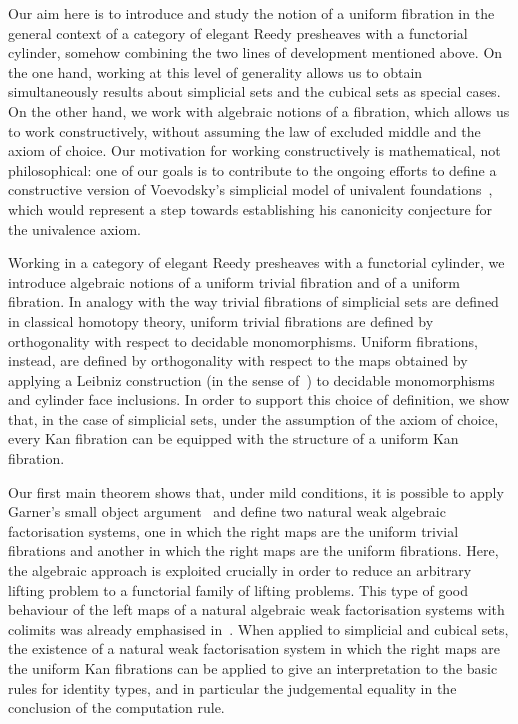 \documentclass[reqno,10pt,a4paper,oneside]{amsart}
\begin{document}
Our aim here is to introduce and study the notion of a uniform fibration in the general context of
a category of elegant Reedy presheaves with a functorial cylinder, somehow combining the two lines of development mentioned above. 
On the one hand, working  at this level of generality allows us  
to obtain simultaneously results about simplicial sets and the cubical sets as special cases. On the other hand, we work with algebraic notions of a fibration,
which allows us to work constructively, \ie without assuming the law of excluded middle and the axiom of choice. Our motivation for working constructively is mathematical, not philosophical: one of our goals is to contribute to the ongoing efforts to define a constructive version of Voevodsky's simplicial model of univalent foundations~\cite{voevodsky-simplicial-model}, which would represent a step towards establishing his canonicity conjecture for the univalence axiom. 



Working in a category of elegant Reedy presheaves with a functorial cylinder,
we introduce algebraic notions of a uniform trivial fibration and of a uniform fibration.
In analogy with the way trivial fibrations of simplicial sets are defined in classical homotopy theory,
uniform trivial fibrations are defined by orthogonality with respect to decidable monomorphisms. Uniform fibrations, instead, are defined by orthogonality with respect to the maps obtained by 
applying a Leibniz construction (in the sense of~\cite{riehl-verity:reedy}) to decidable monomorphisms and cylinder face inclusions. In order to support this choice of definition, we show that, in the case of simplicial sets, under the assumption of the axiom of choice, every Kan fibration can be equipped with the structure of a uniform Kan fibration.

Our first main theorem shows that, under mild conditions, it is possible to apply Garner's small
object argument~\cite{garner:small-object-argument}  and define two natural weak algebraic factorisation systems, one in which 
the right maps are the uniform trivial fibrations and another in which the right maps are the 
uniform fibrations. Here, the algebraic approach is exploited crucially in order to 
reduce an arbitrary lifting problem to a functorial family of lifting problems. This 
type of good behaviour of the left maps of a natural algebraic weak factorisation systems with 
colimits was already emphasised in~\cite{riehl-cat-homotopy}. When applied to 
simplicial and cubical sets, the existence of a natural weak factorisation system 
in which the right maps are the uniform Kan fibrations can be applied to give an interpretation to
the basic rules for identity types, and in particular the judgemental equality in the 
conclusion of the computation rule.
\end{document}
